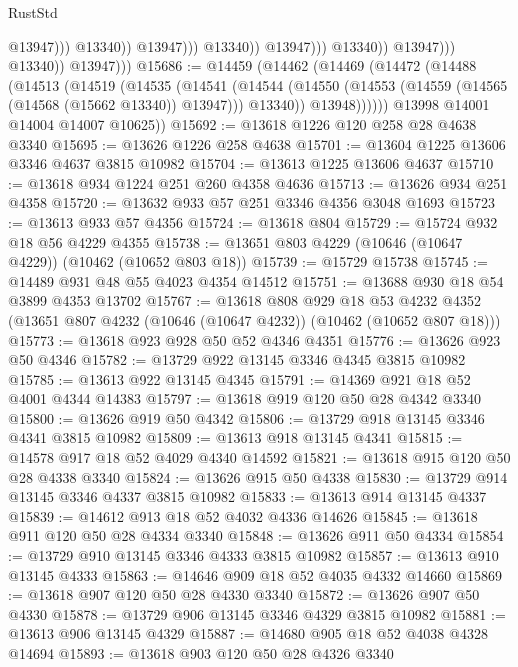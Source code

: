\begin{lexlean}{RustStd}
\begin{coremodule}
                                                  @13947)))
                                            @13340))
                                        @13947)))
                                  @13340))
                              @13947)))
                        @13340))
                    @13947)))
              @13340))
          @13947)))
@15686 := @14459
    (@14462
      (@14469
        (@14472
          (@14488
            (@14513
              (@14519
                (@14535
                  (@14541
                    (@14544
                      (@14550 (@14553 (@14559 (@14565 (@14568 (@15662 @13340)) @13947))) @13340))
                    @13948))))))
        @13998
        @14001
        @14004
        @14007
        @10625))
@15692 := @13618 @1226 @120 @258 @28 @4638 @3340
@15695 := @13626 @1226 @258 @4638
@15701 := @13604 @1225 @13606 @3346 @4637 @3815 @10982
@15704 := @13613 @1225 @13606 @4637
@15710 := @13618 @934 @1224 @251 @260 @4358 @4636
@15713 := @13626 @934 @251 @4358
@15720 := @13632 @933 @57 @251 @3346 @4356 @3048 @1693
@15723 := @13613 @933 @57 @4356
@15724 := @13618 @804
@15729 := @15724 @932 @18 @56 @4229 @4355
@15738 := @13651 @803 @4229 (@10646 (@10647 @4229)) (@10462 (@10652 @803 @18))
@15739 := @15729 @15738
@15745 := @14489 @931 @48 @55 @4023 @4354 @14512
@15751 := @13688 @930 @18 @54 @3899 @4353 @13702
@15767 := @13618
    @808
    @929
    @18
    @53
    @4232
    @4352
    (@13651 @807 @4232 (@10646 (@10647 @4232)) (@10462 (@10652 @807 @18)))
@15773 := @13618 @923 @928 @50 @52 @4346 @4351
@15776 := @13626 @923 @50 @4346
@15782 := @13729 @922 @13145 @3346 @4345 @3815 @10982
@15785 := @13613 @922 @13145 @4345
@15791 := @14369 @921 @18 @52 @4001 @4344 @14383
@15797 := @13618 @919 @120 @50 @28 @4342 @3340
@15800 := @13626 @919 @50 @4342
@15806 := @13729 @918 @13145 @3346 @4341 @3815 @10982
@15809 := @13613 @918 @13145 @4341
@15815 := @14578 @917 @18 @52 @4029 @4340 @14592
@15821 := @13618 @915 @120 @50 @28 @4338 @3340
@15824 := @13626 @915 @50 @4338
@15830 := @13729 @914 @13145 @3346 @4337 @3815 @10982
@15833 := @13613 @914 @13145 @4337
@15839 := @14612 @913 @18 @52 @4032 @4336 @14626
@15845 := @13618 @911 @120 @50 @28 @4334 @3340
@15848 := @13626 @911 @50 @4334
@15854 := @13729 @910 @13145 @3346 @4333 @3815 @10982
@15857 := @13613 @910 @13145 @4333
@15863 := @14646 @909 @18 @52 @4035 @4332 @14660
@15869 := @13618 @907 @120 @50 @28 @4330 @3340
@15872 := @13626 @907 @50 @4330
@15878 := @13729 @906 @13145 @3346 @4329 @3815 @10982
@15881 := @13613 @906 @13145 @4329
@15887 := @14680 @905 @18 @52 @4038 @4328 @14694
@15893 := @13618 @903 @120 @50 @28 @4326 @3340

\end{coremodule}
\end{lexlean}
